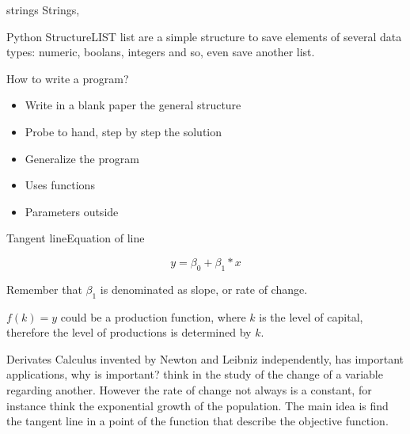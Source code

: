 \documentclass{beamer}
\begin{document}
\begin{frame}{strings}
Strings, 

\end{frame}


\begin{frame}{Python Structure}{LIST}
list are a simple structure to save elements of several data types: numeric, boolans, integers and so, 
even save another list.
\end{frame}





\begin{frame}{How to write a program?}
\begin{itemize}
\item Write in a blank paper the general structure

\item Probe to hand, step by step the solution

\item Generalize the program

\item Uses functions 

\item Parameters outside
\end{itemize}
\end{frame}


\begin{frame}{Tangent line}{Equation of line}

\begin{equation}
y = \beta_{0} + \beta_{1}*x 
\end{equation}

Remember that $\beta_{1}$ is denominated as slope, or rate of change.

$f(k) = y$ could be a production function, where  $k$ is the level of capital, therefore the level of productions is determined by $k$.
\end{frame}


\begin{frame}{Derivates}
Calculus invented by Newton and Leibniz independently, has important applications, why is important?
think in the study of the change of a variable regarding another. However the rate of change not always is a constant, for instance think the exponential growth of the population. The main idea is find the tangent line in a point of the function  that describe the objective function.
\end{frame}
\end{document}
